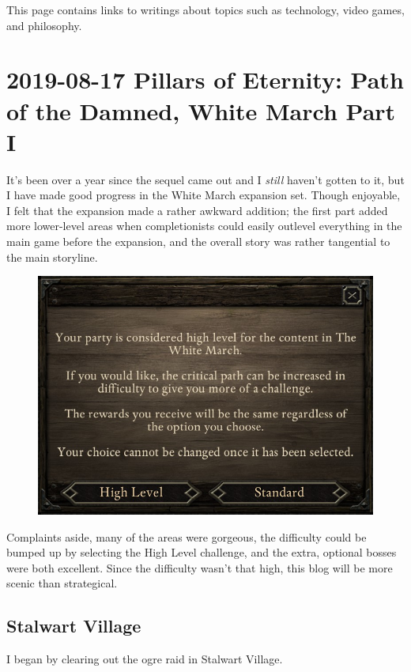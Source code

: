 \documentclass{article}
\begin{document}
This page contains links to writings about topics such as technology, video games, and philosophy.

\tableofchildlinks*

\section{2019-08-17 Pillars of Eternity: Path of the Damned, White March Part I}
It's been over a year since the sequel came out and I \emph{still} haven't gotten to it, but I have made good progress in the White March expansion set.  Though enjoyable, I felt that the expansion made a rather awkward addition; the first part added more lower-level areas when completionists could easily outlevel everything in the main game before the expansion, and the overall story was rather tangential to the main storyline.

\begin{figure}
\includegraphics[scale=0.7]{files/blog/2019_08_17_poe_potd_wmpt1/2019_08_17_high_level.jpg}
\end{figure}

Complaints aside, many of the areas were gorgeous, the difficulty could be bumped up by selecting the High Level challenge, and the extra, optional bosses were both excellent.  Since the difficulty wasn't that high, this blog will be more scenic than strategical.

\subsection{Stalwart Village}
I began by clearing out the ogre raid in Stalwart Village.
\end{document}

